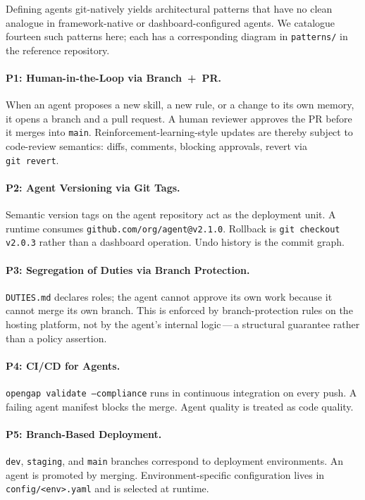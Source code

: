 \documentclass[11pt,a4paper]{article}
\begin{document}
Defining agents git-natively yields architectural patterns that have no clean analogue
in framework-native or dashboard-configured agents. We catalogue fourteen such patterns
here; each has a corresponding diagram in \texttt{patterns/} in the reference
repository.

\paragraph{P1: Human-in-the-Loop via Branch~+~PR.}
When an agent proposes a new skill, a new rule, or a change to its own memory, it
opens a branch and a pull request. A human reviewer approves the PR before it merges
into \texttt{main}. Reinforcement-learning-style updates are thereby subject to
code-review semantics: diffs, comments, blocking approvals, revert via
\texttt{git~revert}.

\paragraph{P2: Agent Versioning via Git Tags.}
Semantic version tags on the agent repository act as the deployment unit. A runtime
consumes \texttt{github.com/org/agent@v2.1.0}. Rollback is \texttt{git checkout v2.0.3}
rather than a dashboard operation. Undo history is the commit graph.

\paragraph{P3: Segregation of Duties via Branch Protection.}
\texttt{DUTIES.md} declares roles; the agent cannot approve its own work because it
cannot merge its own branch. This is enforced by branch-protection rules on the hosting
platform, not by the agent's internal logic\,---\,a structural guarantee rather than a
policy assertion.

\paragraph{P4: CI/CD for Agents.}
\texttt{opengap validate --compliance} runs in continuous integration on every push.
A failing agent manifest blocks the merge. Agent quality is treated as code quality.

\paragraph{P5: Branch-Based Deployment.}
\texttt{dev}, \texttt{staging}, and \texttt{main} branches correspond to deployment
environments. An agent is promoted by merging. Environment-specific configuration
lives in \texttt{config/<env>.yaml} and is selected at runtime.
\end{document}
